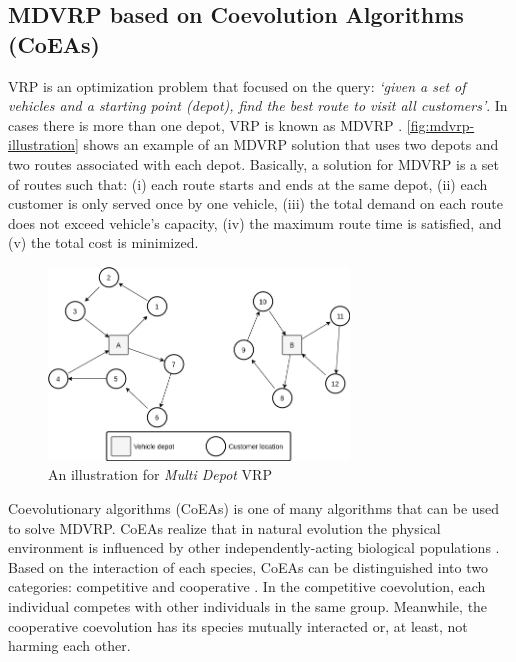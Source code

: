 \documentclass[conference]{IEEEtran}
\begin{document}
\subsection{MDVRP based on Coevolution Algorithms (CoEAs)}
\label{ssec:evolution-algorithms}
VRP is an optimization problem that focused on the query: \textit{`given a set of vehicles and a starting point (depot), find the best route to visit all customers'}. In cases there is more than one depot, VRP is known as MDVRP \cite{montoya-torres_literature_2015}. \autoref{fig:mdvrp-illustration} shows an example of an MDVRP solution that uses two depots and two routes associated with each depot. Basically, a solution for MDVRP is a set of routes such that: (i) each route starts and ends at the same depot, (ii) each customer is only served once by one vehicle, (iii) the total demand on each route does not exceed vehicle's capacity, (iv) the maximum route time is satisfied, and (v) the total cost is minimized.

\begin{figure}[!]
	\centering
	\includegraphics[width=8cm]{Resources/Images/mdvrp-illustration}
	\caption{An illustration for \textit{Multi Depot} VRP}
	\label{fig:mdvrp-illustration}
\end{figure}

Coevolutionary algorithms (CoEAs) is one of many algorithms \cite{cordeau_tabu_1997, pisinger_general_2007, lau_application_2010, cordeau_parallel_2012, subramanian_hybrid_2013, vidal_implicit_2014, escobar_hybrid_2014, de_oliveira_cooperative_2016} that can be used to solve MDVRP. CoEAs realize that in natural evolution the physical environment is influenced by other independently-acting biological populations \cite{engelbrecht_coevolution_2007}. Based on the interaction of each species, CoEAs can be distinguished into two categories: competitive and cooperative \cite{engelbrecht_coevolution_2007}. In the competitive coevolution, each individual competes with other individuals in the same group. Meanwhile, the cooperative coevolution has its species mutually interacted or, at least, not harming each other.
\end{document}
